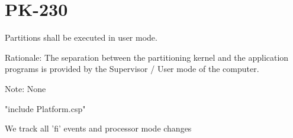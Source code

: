 \section{PK-230} %

       Partitions shall be executed in user mode.

  Rationale: The separation between the partitioning kernel and the application
  programs is provided by the Supervisor / User mode of the computer.

  Note: None


\begin{assert} "include Platform.csp" \end{assert}

We track all 'fi' events and processor mode changes


